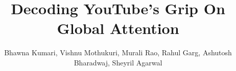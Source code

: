 \documentclass[sigconf,11pt]{acmart}
\begin{document}
\title{\Large Decoding YouTube's Grip On Global Attention}

\author{\normalsize Bhawna Kumari, Vishnu Mothukuri, Murali Rao, Rahul Garg, Ashutosh Bharadwaj, Sheyril Agarwal}







\end{document}
